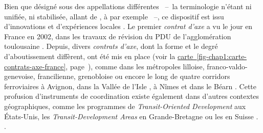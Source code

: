 \begin{refsegment}
{    Bien que désigné sous des appellations différentes \textcolor{blue}{\autocite[10]{cerema_articuler_2015}}~–~la terminologie n'étant ni unifiée, ni stabilisée, allant de , à  par exemple \textcolor{blue}{\autocite[2]{cerema_articuler_2010}}~–, ce dispositif est issu d'innovations et d'expériences locales \textcolor{blue}{\autocite[25]{meunier-chabert_contrats_2014}}. Le premier \textsl{contrat d'axe} a vu le jour en France en 2002, dans les travaux de révision du \acrfull{PDU} de l'agglomération toulousaine \textcolor{blue}{\autocite[10]{cerema_articuler_2015}}. Depuis, divers \textsl{contrats d'axe}, dont la forme et le degré d'aboutissement diffèrent, ont été mis en place (voir la \hyperref[fig-chap1:carte-contrats-axe-france]{carte~\ref{fig-chap1:carte-contrats-axe-france}}, page~\pageref{fig-chap1:carte-contrats-axe-france}), comme dans les métropoles lilloise, franco-valdo-genevoise, francilienne, grenobloise \textcolor{blue}{\autocite[2]{cerema_articuler_2010}} ou encore le long de quatre corridors ferroviaires à Avignon, dans la Vallée de l'Isle \textcolor{blue}{\autocite[116]{bentayou_contrat_2015}}, à Nîmes \textcolor{blue}{\autocite[15]{haro_ligne_2021}} et dans le Béarn \textcolor{blue}{\autocite{fandio_contrat_2023}}. Cette profusion d'instruments de coordination existe également dans d'autres contextes géographiques, comme les programmes de \textsl{Transit-Oriented Development} aux États-Unis, les \textsl{Transit-Development Areas} en Grande-Bretagne ou les  en Suisse \textcolor{blue}{\autocites[427]{maulat_coordonner_2014}[25]{walter_coordination_2015}}.
} \textcolor{blue}{\autocite[173]{maulat_coordonner_2014}}.%


\end{refsegment}
